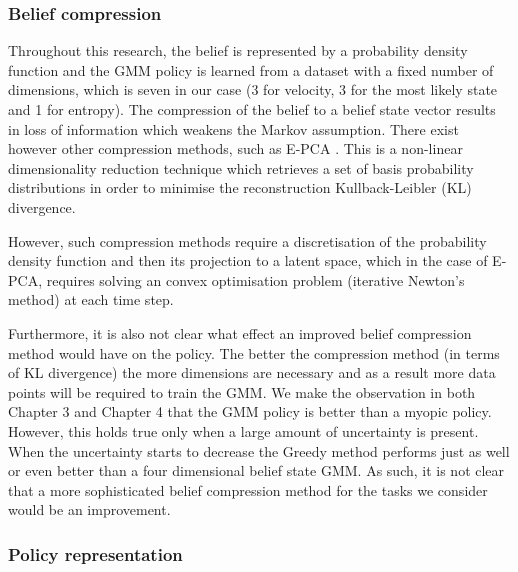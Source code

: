 \subsubsection{Belief compression}
%
%
%

Throughout this research, the belief is represented by a probability density function and the GMM policy
is learned from a dataset with a fixed number of dimensions, which is seven in our case (3 for velocity, 
3 for the most likely state and 1 for entropy). The compression of the belief to a belief state vector results 
in loss of information which weakens the Markov assumption. There exist however other compression methods, such 
as E-PCA \cite{EPCA_2003}. This is a non-linear dimensionality reduction technique which retrieves a set of basis probability 
distributions in order to minimise the reconstruction Kullback-Leibler (KL) divergence. 

However, such compression methods require a discretisation of the probability 
density function and then its projection to a latent space, which in the case of E-PCA, requires solving
an convex optimisation problem (iterative Newton's method) at each time step. 

Furthermore, it is also not clear what effect an improved belief compression method would have on the policy. The better 
the compression method (in terms of KL divergence) the more dimensions are necessary and as a result 
more data points will be required to train the GMM. We make the observation in both Chapter 3 and Chapter 4 that the 
GMM policy is better than a myopic policy. However, this holds true only when a large amount of uncertainty 
is present. When the uncertainty starts to decrease the Greedy method performs just as well or even better than a 
four dimensional belief state GMM. As such, it is not clear that a more sophisticated belief compression method for 
the tasks we consider would be an improvement.


\subsubsection{Policy representation}



